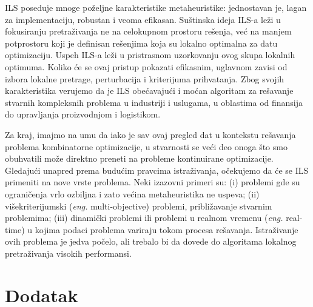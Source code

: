 \documentclass[a4paper]{article}
\newcommand{\eng}[1]{(\textit{eng.} #1)}
\begin{document}
ILS poseduje mnoge poželjne karakteristike metaheuristike: jednostavan je, lagan za implementaciju, robustan i veoma efikasan. Suštinska ideja ILS-a leži u fokusiranju pretraživanja ne na celokupnom prostoru rešenja, već na manjem potprostoru koji je definisan rešenjima koja su lokalno optimalna za datu optimizaciju. Uspeh ILS-a leži u pristrasnom uzorkovanju ovog skupa lokalnih optimuma. Koliko će se ovaj pristup pokazati efikasnim, uglavnom zavisi od izbora lokalne pretrage, perturbacija i kriterijuma prihvatanja. Zbog svojih karakteristika verujemo da je ILS obećavajući i moćan algoritam za rešavanje stvarnih kompleksnih problema u industriji i uslugama, u oblastima od finansija do upravljanja proizvodnjom i logistikom.\par
Za kraj, imajmo na umu da iako je sav ovaj pregled dat u kontekstu rešavanja problema kombinatorne optimizacije, u stvarnosti se veći deo onoga što smo obuhvatili može direktno preneti na probleme kontinuirane optimizacije. Gledajući unapred prema budućim pravcima istraživanja, očekujemo da će se ILS primeniti na nove vrste problema. Neki izazovni primeri su: (i) problemi gde su ograničenja vrlo ozbiljna i zato većina metaheuristika ne uspeva; (ii) višekriterijumski \eng{multi-objective} problemi, približavanje stvarnim problemima; (iii) dinamički problemi ili problemi u realnom vremenu \eng{real-time} u kojima podaci problema variraju tokom procesa rešavanja.
Istraživanje ovih problema je jedva počelo, ali trebalo bi da dovede do algoritama lokalnog pretraživanja visokih performansi.



\appendix
 


\appendix
\section{Dodatak}
\label{sec:dodatak}
\end{document}
